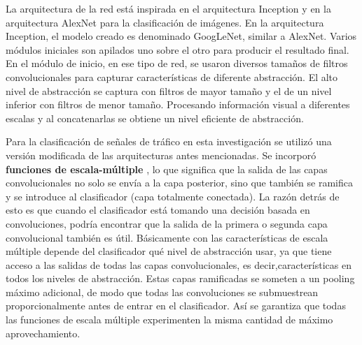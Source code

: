 	La arquitectura de la red está inspirada en el arquitectura Inception \citep{Inception} y en la arquitectura AlexNet\citep{Krizhevsky2012} para la clasificación de imágenes. En la arquitectura Inception, el modelo creado es denominado GoogLeNet, similar a AlexNet. Varios módulos iniciales son apilados uno sobre el otro para producir el resultado final. En el módulo de inicio, en ese tipo de red, se usaron diversos tamaños de filtros convolucionales para capturar características de diferente abstracción. El alto nivel de abstracción se captura con filtros de mayor tamaño y el de un nivel inferior con filtros de menor tamaño. Procesando información visual a diferentes escalas y al concatenarlas se obtiene un nivel eficiente de abstracción. 

	Para la clasificación de señales de tráfico en esta investigación se utilizó una versión modificada de las arquitecturas antes mencionadas. Se incorporó {\bf funciones de escala-múltiple} \citep{Multi_scale_feat}, lo que significa que la salida de las capas convolucionales no solo se envía a la capa posterior, sino que también se ramifica y se introduce al clasificador (capa totalmente conectada). La razón detrás de esto es que cuando el clasificador está tomando una decisión basada en convoluciones, podría encontrar que la salida de la primera o segunda capa convolucional también es útil. Básicamente con las características de escala múltiple depende del clasificador qué nivel de abstracción usar, ya que tiene acceso a las salidas de todas las capas convolucionales, es decir,características en todos los niveles de abstracción. Estas capas ramificadas se someten a un pooling máximo adicional, de modo que todas las convoluciones se submuestrean proporcionalmente antes de entrar en el clasificador. Así se garantiza que todas las funciones de escala múltiple experimenten la misma cantidad de máximo aprovechamiento.
	
